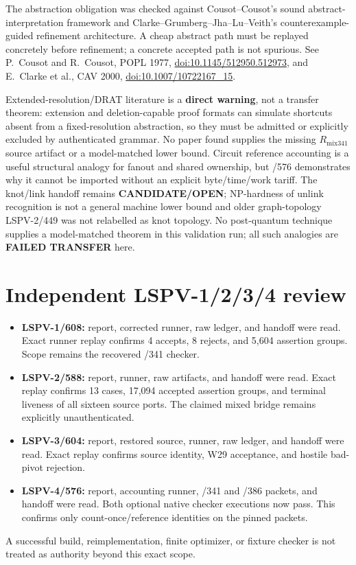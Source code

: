 \documentclass[11pt]{article}
\newcommand{\status}[1]{\textbf{#1}}
\begin{document}
The abstraction obligation was checked against Cousot--Cousot's sound
abstract-interpretation framework and Clarke--Grumberg--Jha--Lu--Veith's
counterexample-guided refinement architecture.  A cheap abstract path must be
replayed concretely before refinement; a concrete accepted path is not
spurious.  See P.~Cousot and R.~Cousot, POPL 1977,
\href{https://doi.org/10.1145/512950.512973}{doi:10.1145/512950.512973},
and E.~Clarke et al., CAV 2000,
\href{https://doi.org/10.1007/10722167_15}{doi:10.1007/10722167\_15}.

Extended-resolution/DRAT literature is a \status{direct warning}, not a
transfer theorem: extension and deletion-capable proof formats can simulate
shortcuts absent from a fixed-resolution abstraction, so they must be admitted
or explicitly excluded by authenticated grammar.  No paper found supplies the
missing $R_{\mathrm{mix341}}$ source artifact or a model-matched lower bound.
Circuit reference accounting is a useful structural analogy for fanout and
shared ownership, but /576 demonstrates why it cannot be imported without an
explicit byte/time/work tariff.  The knot/link handoff remains
\status{CANDIDATE/OPEN}; NP-hardness of unlink recognition is not a general
machine lower bound and older graph-topology LSPV-2/449 was not relabelled as
knot topology.  No post-quantum technique supplies a model-matched theorem in
this validation run; all such analogies are \status{FAILED TRANSFER} here.

\section{Independent LSPV-1/2/3/4 review}
\begin{itemize}
\item \textbf{LSPV-1/608:} report, corrected runner, raw ledger, and handoff
were read.  Exact runner replay confirms 4 accepts, 8 rejects, and 5,604
assertion groups.  Scope remains the recovered /341 checker.
\item \textbf{LSPV-2/588:} report, runner, raw artifacts, and handoff were read.
Exact replay confirms 13 cases, 17,094 accepted assertion groups, and terminal
liveness of all sixteen source ports.  The claimed mixed bridge remains
explicitly unauthenticated.
\item \textbf{LSPV-3/604:} report, restored source, runner, raw ledger, and
handoff were read.  Exact replay confirms source identity, W29 acceptance,
and hostile bad-pivot rejection.
\item \textbf{LSPV-4/576:} report, accounting runner, /341 and /386 packets,
and handoff were read.  Both optional native checker executions now pass.
This confirms only count-once/reference identities on the pinned packets.
\end{itemize}
A successful build, reimplementation, finite optimizer, or fixture checker is
not treated as authority beyond this exact scope.
\end{document}
